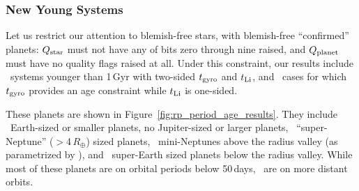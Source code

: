 \documentclass[11pt,twocolumn,tighten]{aastex63}
\begin{document}
\subsubsection{New Young Systems}
%

Let us restrict our attention to blemish-free stars, with blemish-free
``confirmed'' planets:
$Q_{\rm star}$ must not have any of bits zero through nine
raised, and $Q_{\rm planet}$ must have no quality flags raised at all.
Under this constraint,
our results include \ltonegyrhighqconfirmedtwosided\ systems
younger than 1\,Gyr with two-sided $t_{\rm gyro}$ and $t_{\rm Li}$,
and \ltonegyrhighqconfirmedonesided\ cases for which $t_{\rm gyro}$ provides
an age constraint while $t_{\rm Li}$ is one-sided.

These planets are shown in Figure~\ref{fig:rp_period_age_results}.
They include \nearthshighqconfirmed\ Earth-sized or smaller planets,
no Jupiter-sized or larger planets,
\nsubsaturnshighqconfirmed\ ``super-Neptune'' ($>$4\,$R_\oplus$) sized
planets,
\nminineptuneshighqconfirmed\ mini-Neptunes above the 
radius valley (as parametrized by \citealt{2018MNRAS.479.4786V}),
and \nsuperearthshighqconfirmed\ super-Earth sized planets below the radius valley.
While most of these planets are on orbital periods below 50\,days,
\nlongperiodhighqconfirmed\ are on more distant orbits.

\end{document}
